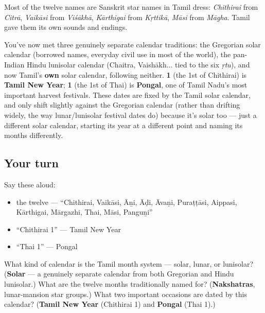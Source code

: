 \begin{cousinweb}
Most of the twelve names are Sanskrit star names in Tamil dress: \emph{Chithirai} from \emph{Citrā}, \emph{Vaikāsi} from \emph{Viśākhā}, \emph{Kārthigai} from \emph{Kṛttikā}, \emph{Māsi} from \emph{Māgha}. Tamil gave them its own sounds and endings.
\end{cousinweb}

\begin{culture}
You've now met three genuinely separate calendar traditions: the Gregorian solar calendar (borrowed names, everyday civil use in most of the world), the pan-Indian Hindu lunisolar calendar (Chaitra, Vaishākh... tied to the six \emph{ṛtu}), and now Tamil's \textbf{own} solar calendar, following neither. \textbf{ 1} (the 1st of Chithirai) is \textbf{Tamil New Year}; \textbf{ 1} (the 1st of Thai) is \textbf{Pongal}, one of Tamil Nadu's most important harvest festivals. These dates are fixed by the Tamil solar calendar, and only shift slightly against the Gregorian calendar (rather than drifting widely, the way lunar/lunisolar festival dates do) because it's solar too — just a different solar calendar, starting its year at a different point and naming its months differently.
\end{culture}

\subsection*{Your turn}
Say these aloud:

\begin{itemize}
\raggedright
  \item the twelve — \textquotedblleft{}Chithirai, Vaikāsi, Āṉi, Āḍi, Āvaṇi, Puraṭṭāsi, Aippasi, Kārthigai, Mārgazhi, Thai, Māsi, Panguṉi\textquotedblright{}
  \item \textquotedblleft{}Chithirai 1\textquotedblright{} — Tamil New Year
  \item \textquotedblleft{}Thai 1\textquotedblright{} — Pongal
\end{itemize}

\begin{tcolorbox}[breakable,colback=teal!4,colframe=teal!35!black,title={Before you move on}]
What kind of calendar is the Tamil month system — solar, lunar, or lunisolar? (\textbf{Solar} — a genuinely separate calendar from both Gregorian and Hindu lunisolar.) What are the twelve months traditionally named for? (\textbf{Nakshatras}, lunar-mansion star groups.) What two important occasions are dated by this calendar? (\textbf{Tamil New Year} (Chithirai 1) and \textbf{Pongal} (Thai 1).)
\end{tcolorbox}
